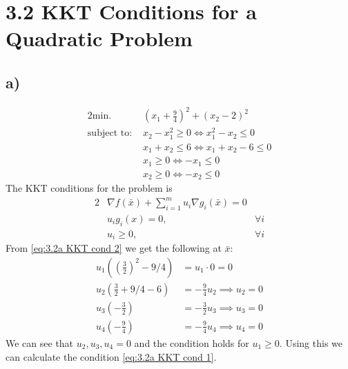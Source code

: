 \documentclass{article}
\begin{document}
\section*{3.2  KKT Conditions for a Quadratic Problem}
\subsection*{a)}
	\begin{alignat}{2}
		\text{min. } & (x_1 +\frac{9}{4})^2 + (x_2 - 2)^2 \\
		\text{subject to: } & x_2-x_1^2 \geq 0 \iff x_1^2-x_2 \leq 0\\
		& x_1 + x_2 \leq 6 \iff  x_1 + x_2 - 6 \leq 0\\
		& x_1 \geq 0 \iff -x_1 \leq 0\\
		& x_2 \geq 0 \iff -x_2 \leq 0
	\end{alignat}
	The KKT conditions for the problem is
	\begin{alignat}{2}
		&\nabla f(\bar{x}) + \sum_{i=1}^{m} u_i \nabla g_i(\bar{x}) = 0 \label{eq:3.2a KKT cond 1}\\
		& u_i g_i(x) = 0 , & \forall i \label{eq:3.2a KKT cond 2}\\
		& u_i \geq0, & \forall i
	\end{alignat}
	From \ref{eq:3.2a KKT cond 2} we get the following at $\bar{x}$:
	\begin{align}
		u_1\left(\left(\frac{3}{2}\right)^2 - 9/4\right) &= u_1 \cdot 0 = 0 \\
		u_2\left(\frac{3}{2} + 9/4 - 6 \right) &= -\frac{9}{4}u_2 \implies u_2 = 0 \\
		u_3 \left(-\frac{3}{2}\right) & = -\frac{3}{2}u_3 \implies u_3 = 0\\
		u_4 \left(-\frac{9}{4}\right) & = -\frac{9}{4}u_4 \implies u_4 = 0
	\end{align}
	We can see that $u_2,u_3,u_4=0$ and the condition holds for $u_1\geq0$. Using this we can calculate the condition \ref{eq:3.2a KKT cond 1}.
\end{document}
